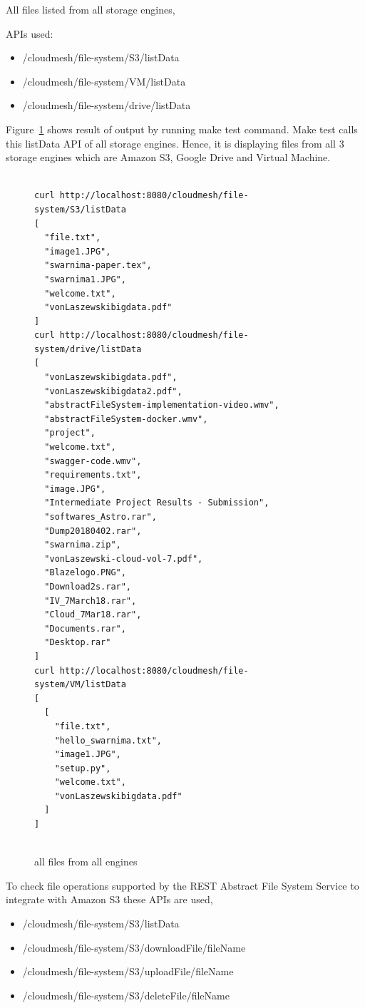 All files listed from all storage engines,

APIs used:

\begin{itemize}
    \item /cloudmesh/file-system/S3/listData
    \item /cloudmesh/file-system/VM/listData
    \item /cloudmesh/file-system/drive/listData
\end{itemize}

Figure~\ref{fig:make-test} shows result of output by running make test 
command. Make test calls this listData API of all storage engines. 
Hence, it is displaying files from all 3 storage engines which are 
Amazon S3, Google Drive and Virtual Machine. 

\begin{figure}[!ht]
\begin{footnotesize}
\begin{verbatim}

curl http://localhost:8080/cloudmesh/file-system/S3/listData
[
  "file.txt",
  "image1.JPG",
  "swarnima-paper.tex",
  "swarnima1.JPG",
  "welcome.txt",
  "vonLaszewskibigdata.pdf"
]
curl http://localhost:8080/cloudmesh/file-system/drive/listData
[
  "vonLaszewskibigdata.pdf",
  "vonLaszewskibigdata2.pdf",
  "abstractFileSystem-implementation-video.wmv",
  "abstractFileSystem-docker.wmv",
  "project",
  "welcome.txt",
  "swagger-code.wmv",
  "requirements.txt",
  "image.JPG",
  "Intermediate Project Results - Submission",
  "softwares_Astro.rar",
  "Dump20180402.rar",
  "swarnima.zip",
  "vonLaszewski-cloud-vol-7.pdf",
  "Blazelogo.PNG",
  "Download2s.rar",
  "IV_7March18.rar",
  "Cloud_7Mar18.rar",
  "Documents.rar",
  "Desktop.rar"
]
curl http://localhost:8080/cloudmesh/file-system/VM/listData
[
  [
    "file.txt",
    "hello_swarnima.txt",
    "image1.JPG",
    "setup.py",
    "welcome.txt",
	"vonLaszewskibigdata.pdf"
  ]
]


\end{verbatim}
\end{footnotesize}
\caption{all files from all engines}\label{fig:make-test}
\end{figure}


To check file operations supported by the REST Abstract File System
Service to integrate with Amazon S3 these APIs are used,
\begin{itemize}
    \item /cloudmesh/file-system/S3/listData
    \item /cloudmesh/file-system/S3/downloadFile/{fileName}
    \item /cloudmesh/file-system/S3/uploadFile/{fileName}
    \item /cloudmesh/file-system/S3/deleteFile/{fileName}
\end{itemize}

